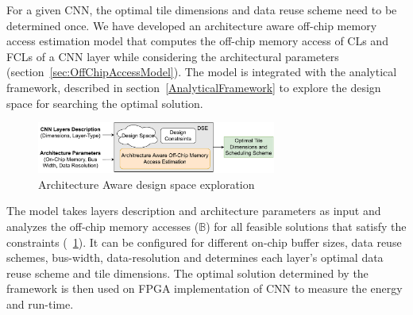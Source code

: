 \documentclass[a4paper,10pt]{article}
\newcommand{\numBytesOffChip}{\mathbb{B}}
\begin{document}
For a given CNN, the optimal tile dimensions and data reuse scheme need to be determined once. We have developed an architecture aware off-chip memory access estimation model  that computes the off-chip memory access of CLs and FCLs of a CNN layer while considering the architectural parameters (section~\ref{sec:OffChipAccessModel}). The model is integrated with the analytical framework, described in section~\ref{AnalyticalFramework} to explore the design space for searching the optimal solution.
\begin{figure}[!htb]
	\centering
    \captionsetup{font=sf}	
	\includegraphics[width=0.7\textwidth]{offlineFrameworkForCNN}
	\caption{Architecture Aware design space exploration}
	\label{fig:offlineFrameworkForCNN}
\end{figure}
The model takes layers description and architecture parameters as input and analyzes the off-chip memory accesses ($\numBytesOffChip$) for all feasible solutions that satisfy the constraints (\figurename~\ref{fig:offlineFrameworkForCNN}). It can be configured for different on-chip buffer sizes, data reuse schemes, bus-width, data-resolution and determines each layer's optimal data reuse scheme and tile dimensions. The optimal solution determined by the framework is then used on FPGA implementation of CNN to measure the energy and run-time. 
\end{document}

